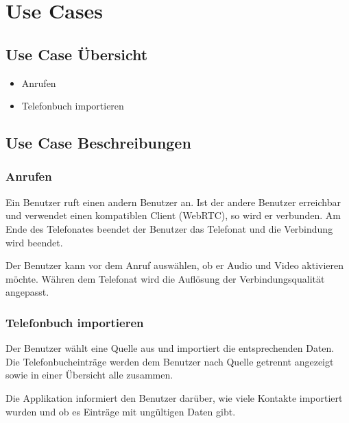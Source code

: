 \chapter{Use Cases}

\section{Use Case Übersicht}
\begin{itemize}
	\item Anrufen
	\item Telefonbuch importieren
\end{itemize}

\section{Use Case Beschreibungen}

\subsection{Anrufen}
Ein Benutzer ruft einen andern Benutzer an. Ist der andere Benutzer erreichbar
und verwendet einen kompatiblen Client (WebRTC), so wird er verbunden.
Am Ende des Telefonates beendet der Benutzer das Telefonat und die Verbindung wird beendet.

Der Benutzer kann vor dem Anruf auswählen, ob er Audio und Video aktivieren möchte. Währen dem Telefonat wird die Auflösung der Verbindungsqualität angepasst.

\subsection{Telefonbuch importieren}
Der Benutzer wählt eine Quelle aus und importiert die entsprechenden Daten. Die Telefonbucheinträge werden dem Benutzer nach Quelle getrennt angezeigt sowie in einer Übersicht alle zusammen.

Die Applikation informiert den Benutzer darüber, wie viele Kontakte importiert wurden und ob es Einträge mit ungültigen Daten gibt.
